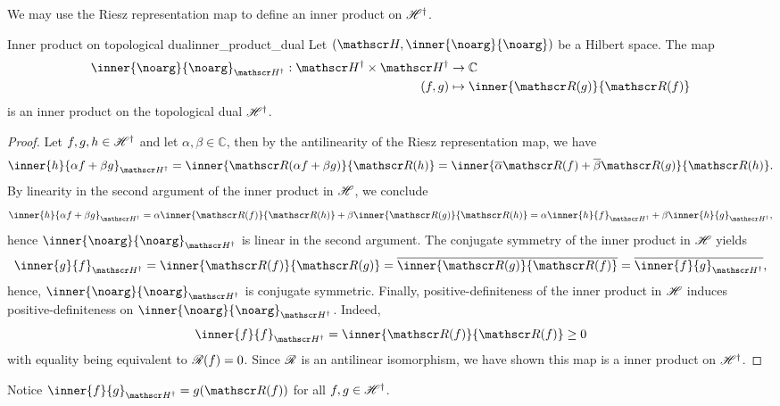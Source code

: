 We may use the Riesz representation map to define an inner product on \(\mathscr{H}^\dag\).
\begin{proposition}{Inner product on topological dual}{inner_product_dual}
    Let \((\hilbert, \inner{\noarg}{\noarg})\) be a Hilbert space. The map
    \begin{align*}
        \inner{\noarg}{\noarg}_{\hilbert^\dag} : \hilbert^\dag \times \hilbert^\dag &\to \mathbb{C}\\
        (f,g) &\mapsto \inner{\riesz(g)}{\riesz(f)}
    \end{align*}
    is an inner product on the topological dual \(\mathscr{H}^\dag\).
\end{proposition}
\begin{proof}
    Let \(f, g, h \in \mathscr{H}^\dag\) and let \(\alpha, \beta \in \mathbb{C}\), then by the antilinearity of the Riesz representation map, we have
    \begin{equation*}
        \inner{h}{\alpha f + \beta g}_{\hilbert^\dag} = \inner{\riesz(\alpha f + \beta g)}{\riesz(h)} = \inner{\conj{\alpha}\riesz(f) + \conj{\beta}\riesz(g)}{\riesz(h)}.
    \end{equation*}
    By linearity in the second argument of the inner product in \(\mathscr{H}\), we conclude
    \begin{equation*}
        \inner{h}{\alpha f + \beta g}_{\hilbert^\dag} = \alpha \inner{\riesz(f)}{\riesz(h)} + \beta \inner{\riesz(g)}{\riesz(h)} = \alpha \inner{h}{f}_{\hilbert^\dag} + \beta \inner{h}{g}_{\hilbert^\dag},
    \end{equation*}
    hence \(\inner{\noarg}{\noarg}_{\hilbert^\dag}\) is linear in the second argument. The conjugate symmetry of the inner product in \(\mathscr{H}\) yields
    \begin{equation*}
        \inner{g}{f}_{\hilbert^\dag} = \inner{\riesz(f)}{\riesz(g)} = \conj{\inner{\riesz(g)}{\riesz(f)}} = \conj{\inner{f}{g}_{\hilbert^\dag}},
    \end{equation*}
    hence, \(\inner{\noarg}{\noarg}_{\hilbert^\dag}\) is conjugate symmetric. Finally, positive-definiteness of the inner product in \(\mathscr{H}\) induces positive-definiteness on \(\inner{\noarg}{\noarg}_{\hilbert^\dag}\). Indeed,
    \begin{equation*}
        \inner{f}{f}_{\hilbert^\dag} = \inner{\riesz(f)}{\riesz(f)} \geq 0
    \end{equation*}
    with equality being equivalent to \(\mathscr{R}(f) = 0\). Since \(\mathscr{R}\) is an antilinear isomorphism, we have shown this map is a inner product on \(\mathscr{H}^\dag\).
\end{proof}
\begin{remark}
    Notice \(\inner{f}{g}_{\hilbert^\dag} = g(\riesz(f))\) for all \(f, g \in \mathscr{H}^\dag\).
\end{remark}

